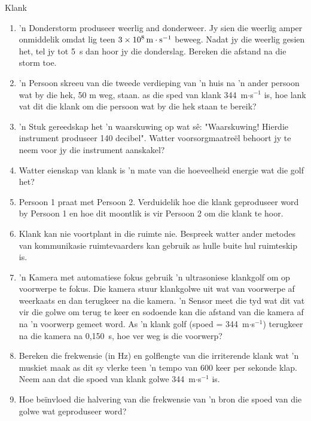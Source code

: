 \begin{eocexercises}{Klank}
\begin{enumerate}[noitemsep, label=\textbf{\arabic*}. ]
\item  'n Donderstorm produseer weerlig and donderweer. Jy sien die weerlig amper onmiddelik omdat lig teen $3\ensuremath{\times}{10}^{8}\phantom{\rule{0.166667em}{0ex}}\text{m}\ensuremath{\cdot}{\text{s}}^{-1}$ beweeg. Nadat jy die weerlig gesien het, tel jy tot 5~s dan hoor jy die donderslag. Bereken die afstand na die storm toe.

\item  'n Persoon skreeu van die tweede verdieping van  'n huis na  'n ander persoon wat by die hek, 50 m weg, staan. as die sped van klank 344~m$\ensuremath{\cdot}$s${}^{-1}$ is, hoe lank vat dit die klank om die persoon wat by die hek staan te bereik?

\item   'n Stuk gereedskap het  'n waarskuwing op wat s\^e: "Waarskuwing! Hierdie instrument produseer 140 decibel". Watter voorsorgmaatre\"el behoort jy te neem voor jy die instrument aanskakel?

\item Watter eienskap van klank is  'n mate van die hoeveelheid energie wat die golf het?

\item Persoon 1 praat met Persoon 2. Verduidelik hoe die klank geproduseer word by Persoon 1 en hoe dit moontlik is vir Persoon 2 om die klank te hoor.

\item Klank kan nie voortplant in die ruimte nie. Bespreek watter ander metodes van kommunikasie ruimtevaarders kan gebruik as hulle buite hul ruimteskip is.

\item  'n Kamera met automatiese fokus gebruik  'n ultrasoniese klankgolf om op voorwerpe te fokus. Die kamera stuur klankgolwe uit wat van voorwerpe af weerkaats en dan terugkeer na die kamera.  'n Sensor meet die tyd wat dit vat vir die golwe om terug te keer en sodoende kan die afstand van die kamera af na  'n voorwerp gemeet word. As  'n klank golf (spoed = 344~m$\ensuremath{\cdot}$s${}^{-1}$) terugkeer na die kamera na 0,150~s, hoe ver weg is die voorwerp?

\item Bereken die frekwensie (in Hz) en golflengte van die irriterende klank wat  'n muskiet maak as dit sy vlerke teen  'n tempo van 600 keer per sekonde klap. Neem aan dat die spoed van klank golwe 344~m$\ensuremath{\cdot}$s${}^{-1}$ is.

\item Hoe be\"invloed die halvering van die frekwensie van  'n bron die spoed van die golwe wat geproduseer word?


\end{enumerate}
\end{eocexercises}
